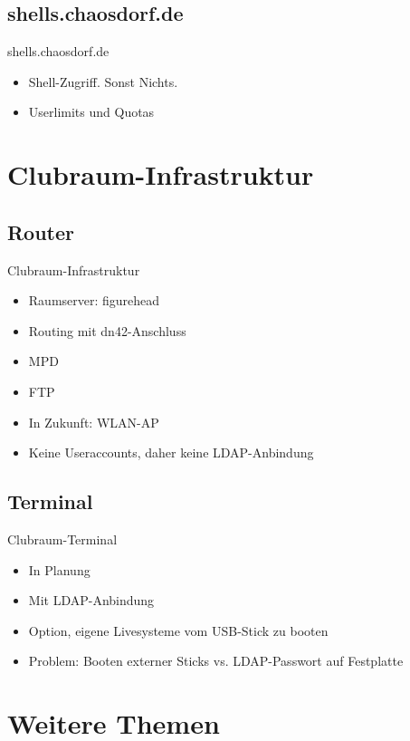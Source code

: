 \documentclass{beamer}
\begin{document}
\subsection{shells.chaosdorf.de}
\begin{frame}{shells.chaosdorf.de}
	\begin{itemize}
		\item Shell-Zugriff. Sonst Nichts.
		\pause \item Userlimits und Quotas
	\end{itemize}
\end{frame}

\section{Clubraum-Infrastruktur}
\subsection{Router}
\begin{frame}{Clubraum-Infrastruktur}
	\begin{itemize}
		\item Raumserver: figurehead
		\pause \item Routing mit dn42-Anschluss
		\pause \item MPD
		\pause \item FTP
		\pause \item In Zukunft: WLAN-AP
		\pause \item Keine Useraccounts, daher keine LDAP-Anbindung
	\end{itemize}
\end{frame}

\subsection{Terminal}
\begin{frame}{Clubraum-Terminal}
	\begin{itemize}
		\item In Planung
		\pause \item Mit LDAP-Anbindung
		\pause \item Option, eigene Livesysteme vom USB-Stick zu booten
		\pause \item Problem: Booten externer Sticks vs. LDAP-Passwort auf
			Festplatte
	\end{itemize}
\end{frame}

\section{Weitere Themen}
\end{document}
